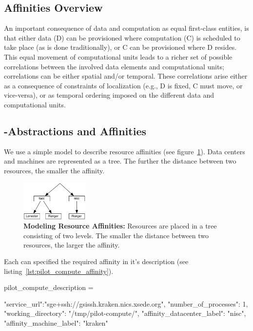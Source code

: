 \documentclass[conference]{IEEEtran}
\begin{document}
\subsection{Affinities Overview}

An important consequence of data and computation as equal first-class
entities, is that either data (D) can be provisioned where computation
(C) is scheduled to take place (as is done traditionally), or C can be
provisioned where D resides. This equal movement of computational
units leads to a richer set of possible correlations between the
involved data elements and computational units; correlations can be
either spatial and/or temporal. These correlations arise either as a
consequence of constraints of localization (e.g., D is fixed, C must
move, or vice-versa), or as temporal ordering imposed on the different
data and computational units.


\subsection{\pilot-Abstractions and Affinities}


We use a simple model to describe resource affinities (see
figure~\ref{fig:figures_resource-topologies}). Data centers and machines are
represented as a tree. The further the distance between two resources, the
smaller the affinity.

\begin{figure}[t]
	\centering
		\includegraphics[width=0.3\textwidth]{figures/resource-topologies.pdf}
	\caption{\textbf{Modeling Resource Affinities:} Resources are placed in a 
	tree consisting of two levels. The smaller the distance between two 
	resources, the larger the affinity.}
	\label{fig:figures_resource-topologies}
\end{figure}

Each \pilot can specified the required affinity in it's description (see
listing~\ref{lst:pilot_compute_affinity}).

\begin{code}[
caption={Creation of a \textit{PilotCompute} on the specified  compute
resource endpoint.},
label={lst:pilot_compute_affinity}]
pilot_compute_description = 

{
    "service_url":"sge+ssh://gsissh.kraken.nics.xsede.org",
    "number_of_processes": 1,                             
    "working_directory": "/tmp/pilot-compute/",
    "affinity_datacenter_label": "nisc",              
    "affinity_machine_label": "kraken" 
}
\end{code}
\end{document}
